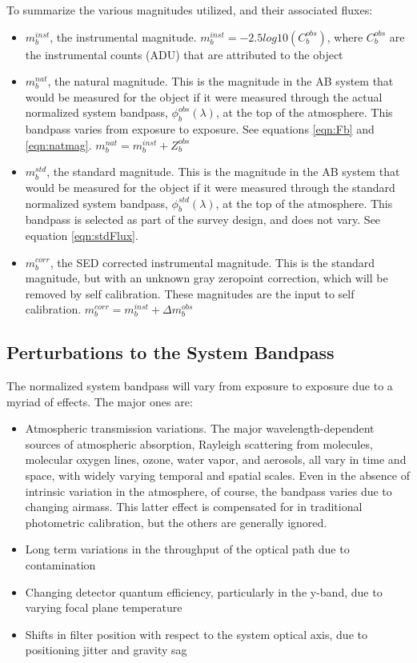 \documentclass[12pt,preprint]{aastex}
\begin{document}
To summarize the various magnitudes utilized, and their associated fluxes:

\begin{itemize}
\item{$m_b^{inst}$, the instrumental magnitude.  $m_b^{inst} = -2.5 log10(C_b^{obs})$, where $C_b^{obs}$ are the instrumental counts (ADU) that are attributed to the object}
\item{$m_b^{nat}$, the natural magnitude.  This is the magnitude in the AB system that would be measured for the object if it were measured through the actual normalized system bandpass, $\phi_b^{obs}(\lambda)$, at the top of the atmosphere.  This bandpass varies
from exposure to exposure.  See equations \ref{eqn:Fb} and \ref{eqn:natmag}. $m_b^{nat} = m_b^{inst} + Z_b^{obs}$}
\item{$m_b^{std}$}, the standard magnitude.  This is the magnitude in the AB system that would be measured for the object if it were measured through the standard normalized system bandpass, $\phi_b^{std}(\lambda)$, at the top of the atmosphere.  This bandpass is 
selected as part of the survey design, and does not vary.  See equation \ref{eqn:stdFlux}. 
\item{$m_b^{corr}$, the SED corrected instrumental magnitude.  This is the standard magnitude, but with an unknown gray zeropoint correction, which will be removed by self calibration.  These magnitudes are the input to self calibration. $m_b^{corr} = m_b^{inst} + \Delta m_b^{obs}$}
\end{itemize}


\subsection{Perturbations to the System Bandpass}
The normalized system bandpass will vary from exposure to exposure due to a myriad of effects.  The major ones are:
\begin{itemize}
\item{Atmospheric transmission variations.  The major wavelength-dependent sources of atmospheric absorption, Rayleigh scattering from molecules, molecular oxygen lines, ozone, water vapor, and aerosols, all vary in time and space, with widely varying temporal and spatial scales.  Even in the absence of intrinsic variation in the atmosphere, of course, the bandpass varies due to changing airmass.  This latter effect is compensated for in traditional photometric calibration, but the others are generally ignored.}
\item{Long term variations in the throughput of the optical path due to contamination}
\item{Changing detector quantum efficiency, particularly in the y-band, due to varying focal plane temperature}
\item{Shifts in filter position with respect to the system optical axis, due to positioning jitter and gravity sag}
\end{itemize}
\end{document}
